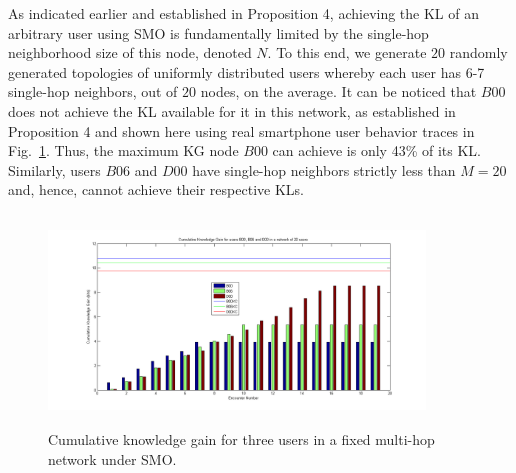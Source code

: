 \documentclass[12pt,epsf]{article}
\theoremstyle{definition}
\begin{document}
As indicated earlier and established in Proposition 4, achieving the KL of an arbitrary user using SMO is fundamentally limited by the single-hop neighborhood size of this node, denoted $N$.
To this end, we generate $20$ randomly generated topologies of uniformly distributed users whereby each user has 6-7 single-hop neighbors, out of $20$ nodes, on the average. It can be noticed that $B00$ 
does not achieve the KL available for it in this network, as established in Proposition 4 and shown here using real smartphone user behavior traces in Fig.~\ref{fig:B00_SMHOP)}. Thus, the maximum KG node $B00$ can achieve is only 43\% of its KL. Similarly, users $B06$ and $D00$ have single-hop neighbors strictly less than $M=20$ and, hence, cannot achieve their respective KLs. 
%
\begin{figure}[!bp]
\centering
 \includegraphics[width=10cm ,height=5.6cm]{figures_png/Fig7}
    \caption{Cumulative knowledge gain for three users in a fixed multi-hop network under SMO.}\label{fig:B00_SMHOP)}
\end{figure} 
    
\end{document}
